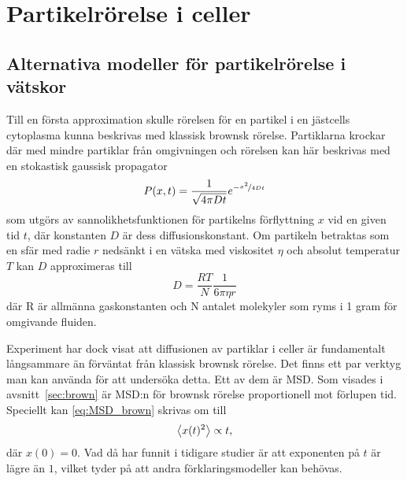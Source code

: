 \chapter{Partikelrörelse i celler}






\section{Alternativa modeller för partikelrörelse i vätskor}

Till en första approximation skulle rörelsen för en partikel i en jästcells cytoplasma kunna beskrivas med klassisk brownsk rörelse. Partiklarna krockar där med mindre partiklar från omgivningen och rörelsen kan här beskrivas med en stokastisk gaussisk propagator~\cite{Einstein1905}
\begin{equation}
P(x,t)=\frac{1}{\sqrt{4\pi Dt}}e^{-\nicefrac{x^2}{4Dt}}
\end{equation} %
som utgörs av sannolikhetsfunktionen för partikelns förflyttning $x$ vid en given tid $t$, där konstanten $D$ är dess diffusionskonstant. Om partikeln betraktas som en sfär med radie $r$ nedsänkt i en vätska med viskositet $\eta$ och absolut temperatur $T$ kan $D$ approximeras till~\cite{Einstein1905}
\begin{equation}
D=\frac{RT}{N}\frac{1}{6\pi \eta r}
\end{equation}
där R är allmänna gaskonstanten och N antalet molekyler som ryms i 1 gram för omgivande fluiden.

Experiment\cite{Midtveldt_etal2016} har dock visat att diffusionen av partiklar i celler är fundamentalt långsammare än förväntat från klassisk brownsk rörelse. Det finns ett par verktyg man kan använda för att undersöka detta. Ett av dem är MSD. Som visades i avsnitt~\ref{sec:brown} är MSD:n för brownsk rörelse proportionell mot förlupen tid. Speciellt kan \eqref{eq:MSD_brown} skrivas om till
\begin{equation}
\ev{x(t)^2} \propto t,
\end{equation}
där $x(0)=0$. Vad \cite{Midtveldt_etal2016} då har funnit i tidigare studier är att exponenten på $t$ är lägre än $1$, vilket tyder på att andra förklaringsmodeller kan behövas. %

